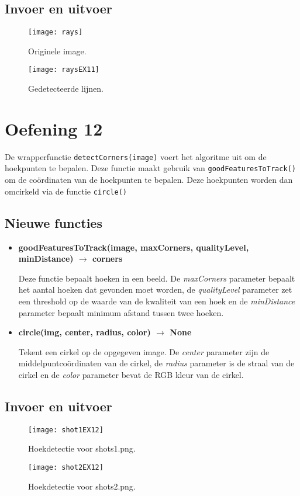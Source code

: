 \documentclass{article}
\begin{document}
	\subsection*{Invoer en uitvoer}
	\begin{figure}[!htb]
		\begin{minipage}{0.48\textwidth}
			\centering
			\texttt{[image: rays]}
			\caption{Originele image.}
		\end{minipage}\hfill
		\begin{minipage}{0.48\textwidth}
			\centering
			\texttt{[image: raysEX11]}
			\caption{Gedetecteerde lijnen.}
		\end{minipage}
	\end{figure}
	\newpage
	\section*{Oefening 12}
	De wrapperfunctie \texttt{detectCorners(image)} voert het algoritme uit om de hoekpunten te bepalen. Deze functie maakt gebruik van \texttt{goodFeaturesToTrack()} om de coördinaten van de hoekpunten te bepalen. Deze hoekpunten worden dan omcirkeld via de functie \texttt{circle()}
	\subsection*{Nieuwe functies}
	\begin{itemize}

		
		\item \textbf{goodFeaturesToTrack(image, maxCorners, qualityLevel, minDistance) $\rightarrow$ corners}
		
		Deze functie bepaalt hoeken in een beeld. De \textit{maxCorners} parameter bepaalt het aantal hoeken dat gevonden moet worden, de \textit{qualityLevel} parameter zet een threshold op de waarde van de kwaliteit van een hoek en de \textit{minDistance} parameter bepaalt minimum afstand tussen twee hoeken. 
		\item \textbf{circle(img, center, radius, color) $\rightarrow$ None}
		
		Tekent een cirkel op de opgegeven image. De \textit{center} parameter zijn de middelpuntcoördinaten van de cirkel, de \textit{radius} parameter is de straal van de cirkel en de \textit{color} parameter bevat de RGB kleur van de cirkel.	 
	\end{itemize}
	
	\subsection*{Invoer en uitvoer}
		\begin{figure}[!htb]
		\begin{minipage}{0.48\textwidth}
			\centering
			\texttt{[image: shot1EX12]}
			\caption{Hoekdetectie voor shots1.png.}
		\end{minipage}\hfill
		\begin{minipage}{0.48\textwidth}
			\centering
			\texttt{[image: shot2EX12]}
			\caption{Hoekdetectie voor shots2.png.}
		\end{minipage}
	\end{figure}
	\newpage
\end{document}
